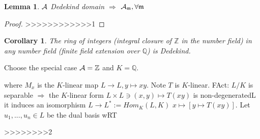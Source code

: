 \documentclass[11pt]{article}
\newtheorem{lemma}[thm]{Lemma}
\newtheorem{cor}[thm]{Corollary}
\newcommand{\intg}{\mathbb Z}
\newcommand{\ratl}{\mathbb Q}
\newcommand{\scm}{{\mathfrak m}}
\newcommand{\cala}{{\cal A}}
\newcommand{\Lrta}{\Longrightarrow}
\newcommand{\lrta}{\longrightarrow}
\begin{document}
\begin{lemma}
$\cala$ Dedekind domain $\Lrta $ $\cala_\scm,\forall\scm$ 
\end{lemma}
\begin{proof}
>>>>>>>>>>>>1
\end{proof}

\begin{cor}
The ring of integers (integral closure of $\intg$ in the number field) in any number field (finite field extension over $\ratl$) is Dedekind. 
\end{cor}
Choose the special case $\cala=\intg$ and $K=\ratl$.

where $M_x$ is the $K$-linear map $L\lrta L, y\longmapsto x y$. Note $T$ is $K$-linear. FAct: $L/K$ is separable $\Lrta $ the $K$-linear form $L\times L\ni (x,y)\longmapsto T(xy)$ is non-degeneratedL it induces an isomorphism $L\lrta L^*:=Hom_K(L,K)$ $x\longmapsto [y\mapsto T(xy)]$. Let $u_1,...,u_n\in L$ be the dual basis wRT

>>>>>>>>2
\end{document}
